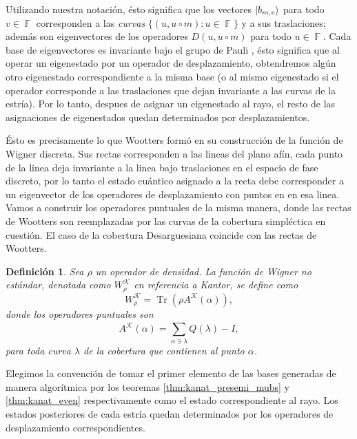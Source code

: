 \documentclass[a4paper]{report}
\DeclareMathOperator{\F}{\mathbb{F}}
\DeclareMathOperator{\Tr}{Tr}
\newtheorem{definition}{Definición}
\begin{document}
  Utilizando nuestra notación, ésto significa que los
  vectores $\ket{b_{m,v}}$ para todo $v \in \F$ corresponden
  a las \textit{curvas} $\{(u, u \circ m) : u \in \F\}$ y a
  sus traslaciones; además son eigenvectores de los
  operadores $D(u, u \circ m)$ para todo $u \in \F$. Cada
  base de eigenvectores es invariante bajo el grupo de
  Pauli \cite{calderbank}, ésto significa que al operar un
  eigenestado por un operador de desplazamiento, obtendremos
  algún otro eigenestado correspondiente a la misma base (o
  al mismo eigenestado si el operador corresponde a las
  traslaciones que dejan invariante a las curvas de la
  estría). Por lo tanto, despues de asignar un eigenestado
  al rayo, el resto de las asignaciones de eigenestados
  quedan determinados por desplazamientos.

  Ésto es precisamente lo que Wootters formó en su
  construcción de la función de Wigner discreta. Sus rectas
  corresponden a las lineas del plano afín, cada punto de la
  linea deja invariante a la linea bajo traslaciones en el
  espacio de fase discreto, por lo tanto el estado cuántico
  asignado a la recta debe corresponder a un eigenvector de
  los operadores de desplazamiento con puntos en en esa
  linea. Vamos a construir los operadores puntuales de la
  misma manera, donde las rectas de Wootters son
  reemplazadas por las curvas de la cobertura simpléctica en
  cuestión. El caso de la cobertura Desarguesiana coincide
  con las rectas de Wootters.
  \begin{definition}
    Sea $\rho$ un operador de densidad. La función de Wigner
    no estándar, denotada como $W_\rho^{\mathcal K}$ en
    referencia a Kantor, se define como
    \begin{equation}
      W_\rho^{\mathcal K}
      = \Tr\left( \rho A^{\mathcal K}(\alpha) \right),
    \end{equation}
    donde los operadores puntuales son
    \begin{equation}
      A^{\mathcal K}(\alpha)
      = \sum_{\alpha \ni \lambda}^{} Q(\lambda) - I,
    \end{equation}
    para toda curva $\lambda$ de la cobertura que contienen
    al punto $\alpha$.
  \end{definition}
  Elegimos la convención de tomar el primer elemento de las
  bases generadas de manera algorítmica por los teoremas
  \ref{thm:kanat_presemi_mubs} y \ref{thm:kanat_even}
  respectivamente como el estado correspondiente al rayo.
  Los estados posteriores de cada estría quedan determinados
  por los operadores de desplazamiento correspondientes.
\end{document}
